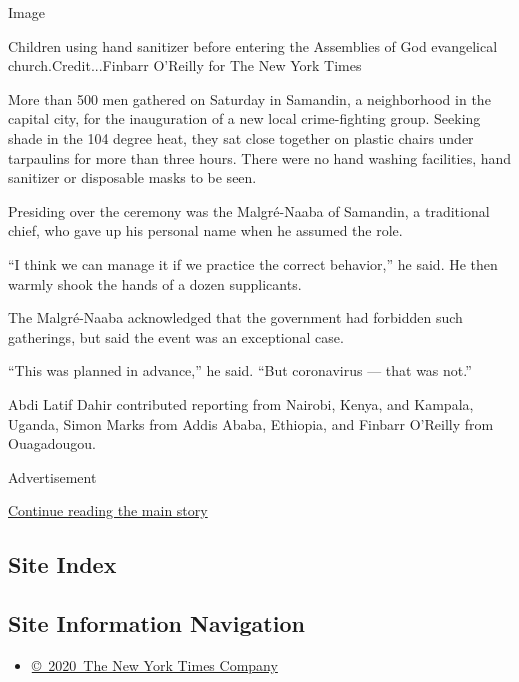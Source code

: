 Image

Children using hand sanitizer before entering the Assemblies of God
evangelical church.Credit...Finbarr O'Reilly for The New York Times

More than 500 men gathered on Saturday in Samandin, a neighborhood in
the capital city, for the inauguration of a new local crime-fighting
group. Seeking shade in the 104 degree heat, they sat close together on
plastic chairs under tarpaulins for more than three hours. There were no
hand washing facilities, hand sanitizer or disposable masks to be seen.

Presiding over the ceremony was the Malgré-Naaba of Samandin, a
traditional chief, who gave up his personal name when he assumed the
role.

``I think we can manage it if we practice the correct behavior,'' he
said. He then warmly shook the hands of a dozen supplicants.

The Malgré-Naaba acknowledged that the government had forbidden such
gatherings, but said the event was an exceptional case.

``This was planned in advance,'' he said. ``But coronavirus --- that was
not.''

Abdi Latif Dahir contributed reporting from Nairobi, Kenya, and Kampala,
Uganda, Simon Marks from Addis Ababa, Ethiopia, and Finbarr O'Reilly
from Ouagadougou.

Advertisement

\protect\hyperlink{after-bottom}{Continue reading the main story}

\hypertarget{site-index}{%
\subsection{Site Index}\label{site-index}}

\hypertarget{site-information-navigation}{%
\subsection{Site Information
Navigation}\label{site-information-navigation}}

\begin{itemize}
\tightlist
\item
  \href{https://help.nytimes.com/hc/en-us/articles/115014792127-Copyright-notice}{©~2020~The
  New York Times Company}
\end{itemize}

